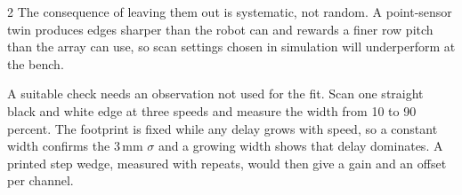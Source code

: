 \documentclass[a4paper,10pt]{article}
\begin{document}
\begin{multicols*}{2}
The consequence of leaving them out is systematic, not random. A point-sensor twin
produces edges sharper than the robot can and rewards a finer row pitch than the
array can use, so scan settings chosen in simulation will underperform at the
bench.

A suitable check needs an observation not used for the fit. Scan one straight
black and white edge at three speeds and measure the width from 10 to 90 percent.
The footprint is fixed while any delay grows with speed, so a constant width
confirms the 3\,mm $\sigma$ and a growing width shows that delay dominates. A
printed step wedge, measured with repeats, would then give a gain and an offset per
channel.


\end{multicols*}
\end{document}
